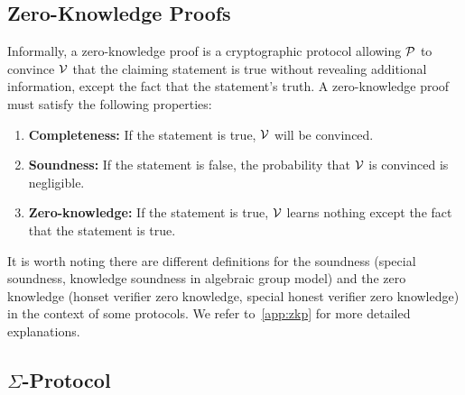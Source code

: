 \subsection{Zero-Knowledge Proofs}
Informally, a zero-knowledge proof is a cryptographic protocol allowing $\mathcal{P}$ to convince $\mathcal{V}$ that the claiming statement is true without revealing additional information, except the fact that the statement's truth. A zero-knowledge proof must satisfy the following properties:
\begin{enumerate}
    \item \textbf{Completeness:} If the statement is true, $\mathcal{V}$ will be convinced.
    \item \textbf{Soundness:} If the statement is false, the probability that $\mathcal{V}$ is convinced is negligible.
    \item \textbf{Zero-knowledge:} If the statement is true, $\mathcal{V}$ learns nothing except the fact that the statement is true.
\end{enumerate}
It is worth noting there are different definitions for the soundness (special soundness, knowledge soundness in algebraic group model) and the zero knowledge (honset verifier zero knowledge, special honest verifier zero knowledge) in the context of some protocols. We refer to~\ref{app:zkp} for more detailed explanations.

\subsection{$\Sigma$-Protocol}


